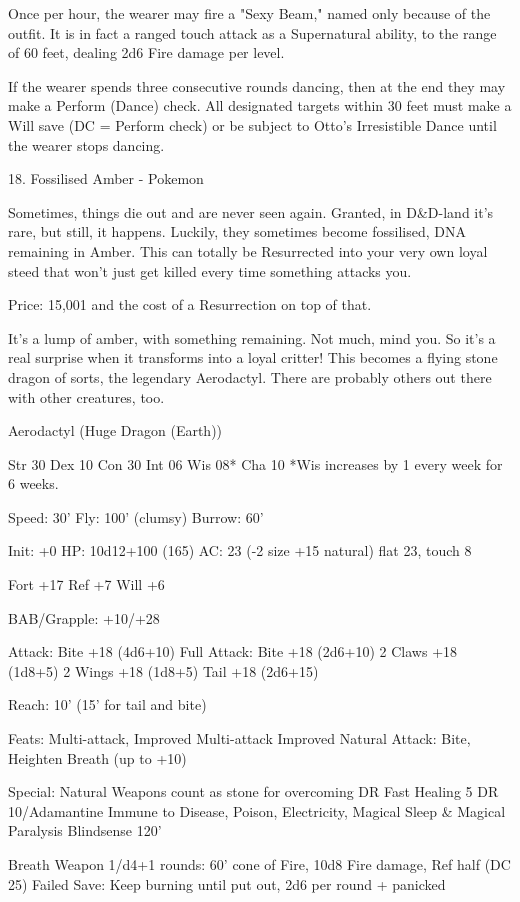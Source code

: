 \begin{multicols}{2}
Once per hour, the wearer may fire a "Sexy Beam," named only because of the outfit. It is in fact a ranged touch attack as a Supernatural ability, to the range of 60 feet, dealing 2d6 Fire damage per level.

If the wearer spends three consecutive rounds dancing, then at the end they may make a Perform (Dance) check. All designated targets within 30 feet must make a Will save (DC = Perform check) or be subject to Otto's Irresistible Dance until the wearer stops dancing.


18. Fossilised Amber - Pokemon

Sometimes, things die out and are never seen again. Granted, in D&D-land it's rare, but still, it happens. Luckily, they sometimes become fossilised, DNA remaining in Amber. This can totally be Resurrected into your very own loyal steed that won't just get killed every time something attacks you.

Price: 15,001 and the cost of a Resurrection on top of that.

It's a lump of amber, with something remaining. Not much, mind you. So it's a real surprise when it transforms into a loyal critter! This becomes a flying stone dragon of sorts, the legendary Aerodactyl. There are probably others out there with other creatures, too.

Aerodactyl (Huge Dragon (Earth))

Str 30 Dex 10 Con 30 Int 06 Wis 08* Cha 10
*Wis increases by 1 every week for 6 weeks.

Speed: 30'
Fly: 100' (clumsy)
Burrow: 60'

Init: +0
HP: 10d12+100 (165)
AC: 23 (-2 size +15 natural)
flat 23, touch 8

Fort +17
Ref +7
Will +6

BAB/Grapple: +10/+28

Attack: Bite +18 (4d6+10)
Full Attack:
Bite +18 (2d6+10)
2 Claws +18 (1d8+5)
2 Wings +18 (1d8+5)
Tail +18 (2d6+15)

Reach: 10' (15' for tail and bite)

Feats:
Multi-attack, Improved Multi-attack
Improved Natural Attack: Bite, Heighten Breath (up to +10)

Special:
Natural Weapons count as stone for overcoming DR
Fast Healing 5
DR 10/Adamantine
Immune to Disease, Poison, Electricity, Magical Sleep & Magical Paralysis
Blindsense 120'

Breath Weapon 1/d4+1 rounds:
60' cone of Fire, 10d8 Fire damage, Ref half (DC 25)
Failed Save: Keep burning until put out, 2d6 per round + panicked


\end{multicols}
